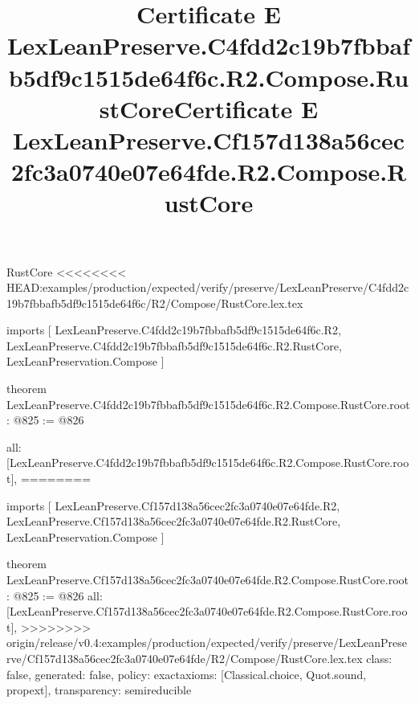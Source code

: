 \begin{lexlean}{RustCore}
<<<<<<<< HEAD:examples/production/expected/verify/preserve/LexLeanPreserve/C4fdd2c19b7fbbafb5df9c1515de64f6c/R2/Compose/RustCore.lex.tex
\title{Certificate E LexLeanPreserve.C4fdd2c19b7fbbafb5df9c1515de64f6c.R2.Compose.RustCore}
\begin{coremodule}
imports [
  LexLeanPreserve.C4fdd2c19b7fbbafb5df9c1515de64f6c.R2,
  LexLeanPreserve.C4fdd2c19b7fbbafb5df9c1515de64f6c.R2.RustCore,
  LexLeanPreservation.Compose
]

theorem LexLeanPreserve.C4fdd2c19b7fbbafb5df9c1515de64f6c.R2.Compose.RustCore.root : @825 := @826 {
  all: [LexLeanPreserve.C4fdd2c19b7fbbafb5df9c1515de64f6c.R2.Compose.RustCore.root],
========
\title{Certificate E LexLeanPreserve.Cf157d138a56cec2fc3a0740e07e64fde.R2.Compose.RustCore}
\begin{coremodule}
imports [
  LexLeanPreserve.Cf157d138a56cec2fc3a0740e07e64fde.R2,
  LexLeanPreserve.Cf157d138a56cec2fc3a0740e07e64fde.R2.RustCore,
  LexLeanPreservation.Compose
]

theorem LexLeanPreserve.Cf157d138a56cec2fc3a0740e07e64fde.R2.Compose.RustCore.root : @825 := @826 {
  all: [LexLeanPreserve.Cf157d138a56cec2fc3a0740e07e64fde.R2.Compose.RustCore.root],
>>>>>>>> origin/release/v0.4:examples/production/expected/verify/preserve/LexLeanPreserve/Cf157d138a56cec2fc3a0740e07e64fde/R2/Compose/RustCore.lex.tex
  class: false,
  generated: false,
  policy: exact{axioms: [Classical.choice, Quot.sound, propext]},
  transparency: semireducible
}


\end{coremodule}}
\end{coremodule}
\end{lexlean}
